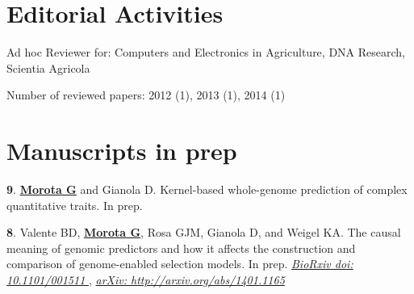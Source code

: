 \documentclass[margin,line,10pt]{res}
\newenvironment{list1}{
  \begin{list}{\ding{113}}{%
      \setlength{\itemsep}{0in}
      \setlength{\parsep}{0in} \setlength{\parskip}{0in}
      \setlength{\topsep}{0in} \setlength{\partopsep}{0in} 
      \setlength{\leftmargin}{0.17in}}}{\end{list}}
\begin{document}
\begin{resume}
\vspace{0.5cm}
\section{\sc Editorial Activities}
\vspace{.1cm}
Ad hoc Reviewer for: Computers and Electronics in Agriculture, DNA Research, Scientia Agricola
\vspace{.1cm}

Number of reviewed papers:
2012 (1), 2013 (1), 2014 (1) 


\vspace{0.5cm}
\section{\sc Manuscripts in prep}


\begin{list1}
\item [{\bf 9}.]  {\bf \underline{Morota G}} and Gianola D.   
     Kernel-based whole-genome prediction of complex quantitative traits. In prep. %

\vspace{0.5cm}

\item [{\bf 8}.]  Valente BD, {\bf \underline{Morota G}}, Rosa GJM, Gianola D, and Weigel KA.   
     The causal meaning of genomic predictors and how it affects the construction and  
     comparison of genome-enabled selection models. In prep. \textcolor{blue}{\href{http://biorxiv.org/content/early/2013/12/21/001511}{{\it BioRxiv doi: 10.1101/001511 }}},  %
\hspace{2.7pt} \textcolor{blue}{\href{http://arxiv.org/abs/1401.1165}{{\it arXiv: http://arxiv.org/abs/1401.1165 }}} %

\end{list1}


\vspace{0.5cm}









\end{resume}
\end{document}
